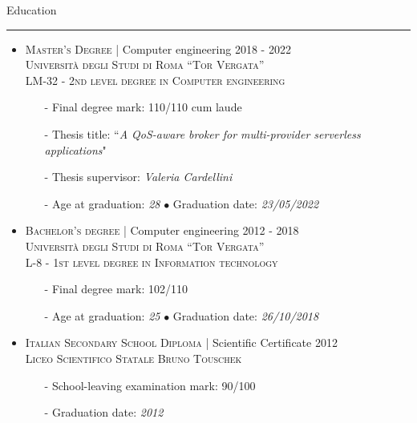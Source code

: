\documentclass[english,10pt,a4paper]{article}
\newcommand{\CompanyName}[1]{\textsc{{\small #1}}}
\newcommand{\JobTimeRange}[1]{{\scriptsize \textcolor{CvColor!50}{\faCalendar*} \hspace{0.01cm} \textcolor{CvIcon}{#1}}}
\newcommand{\CvBullet}{\hspace{0.05cm} \textcolor{CvColor}{$\bullet$} \hspace{0.05cm}}
\newcommand{\CvSection}[2]{
	\hspace{0.25cm}\textcolor{CvColor!50}{#1} \hspace{0.01cm} \textcolor{CvColor!80}{#2}\\
	\textcolor{CvColor}{\rule[.7\baselineskip]{\textwidth}{1pt}}}
\begin{document}
\begin{paracol}{2}
\begin{tcolorbox}[colback=white, height=\textheight,colframe=white, top=0pt,bottom=0pt, 	boxrule=1pt, left=0pt,right=1pt,top=0pt,bottom=0pt, arc=0pt,outer arc=0pt,]
\vspace{0.3cm}	
\CvSection{\faGraduationCap}{Education}
\begin{itemize}
	\item \CompanyName{Master’s Degree} \textcolor{CvColor}{|} {\scriptsize Computer engineering} \hfill \JobTimeRange{2018 - 2022}\\
	{\scriptsize \textcolor{CvIcon}{\textsc{Università degli Studi di Roma ``Tor Vergata''}}} \\
	{\scriptsize \textcolor{CvIcon}{\textsc{LM-32 - 2nd level degree in Computer engineering}}}
	{\scriptsize \begin{itemize}
			\item[-] Final degree mark: \textcolor{CvColor}{110/110 cum laude}
			\item[-] Thesis title: ``\textit{A QoS-aware broker for multi-provider serverless applications}"
			\item[-] Thesis supervisor: \textit{Valeria Cardellini}
			\item[-] Age at graduation: \textit{28} \CvBullet Graduation date: \textit{23/05/2022}	
	\end{itemize}}
	
	\vspace*{0.2cm}
	
	\item \CompanyName{Bachelor's degree} \textcolor{CvColor}{|} {\scriptsize Computer engineering} \hfill \JobTimeRange{2012 - 2018}\\
	{\scriptsize \textcolor{CvIcon}{\textsc{Università degli Studi di Roma ``Tor Vergata''}}} \\
	{\scriptsize \textcolor{CvIcon}{\textsc{L-8 - 1st level degree in Information technology}}}
	{\scriptsize \begin{itemize}
			\item[-] Final degree mark: \textcolor{CvColor}{102/110}
			\item[-] Age at graduation: \textit{25} \CvBullet Graduation date: \textit{26/10/2018}	
	\end{itemize}}
	
	\vspace*{0.2cm}
	
	\item \CompanyName{Italian Secondary School Diploma} \textcolor{CvColor}{|} {\scriptsize Scientific Certificate} \hfill \JobTimeRange{2012}\\
	{\scriptsize \textcolor{CvIcon}{\textsc{Liceo Scientifico Statale Bruno Touschek}}} 
	{\scriptsize \begin{itemize}
			\item[-] School-leaving examination mark: \textcolor{CvColor}{90/100}
			\item[-] Graduation date: \textit{2012}
	\end{itemize}}
	

\end{itemize}
\end{tcolorbox}
\end{paracol}
\end{document}
